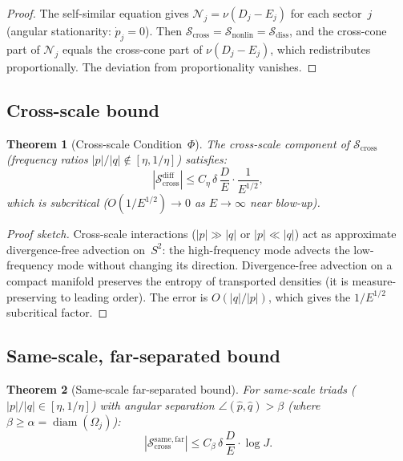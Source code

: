 \documentclass[11pt]{article}
\newtheorem{theorem}{Theorem}[section]
\theoremstyle{definition}
\newcommand{\cS}{\mathcal{S}}
\newcommand{\cN}{\mathcal{N}}
\DeclareMathOperator{\diam}{diam}
\begin{document}
\begin{proof}
The self-similar equation gives $\cN_j = \nu(D_j - E_j)$
for each sector~$j$ (angular stationarity: $\dot{p}_j = 0$).
Then
$\cS_{\mathrm{cross}} = \cS_{\mathrm{nonlin}}
= \cS_{\mathrm{diss}}$, and the cross-cone part of
$\cN_j$ equals the cross-cone part of $\nu(D_j - E_j)$,
which redistributes proportionally.  The deviation from
proportionality vanishes.
\end{proof}


\subsection{Cross-scale bound}

\begin{theorem}[Cross-scale Condition~$\Phi$]
\label{thm:cross-scale}
The cross-scale component of $\cS_{\mathrm{cross}}$
(frequency ratios $|p|/|q| \notin [\eta, 1/\eta]$)
satisfies:
\begin{equation}
|\cS_{\mathrm{cross}}^{\mathrm{diff}}|
\leq C_\eta\,\delta\,\frac{D}{E}\cdot\frac{1}{E^{1/2}},
\end{equation}
which is subcritical ($O(1/E^{1/2}) \to 0$ as
$E \to \infty$ near blow-up).
\end{theorem}

\begin{proof}[Proof sketch]
Cross-scale interactions ($|p| \gg |q|$ or $|p| \ll |q|$)
act as approximate divergence-free advection on~$S^2$:
the high-frequency mode advects the low-frequency mode
without changing its direction.  Divergence-free advection
on a compact manifold preserves the entropy of transported
densities (it is measure-preserving to leading order).
The error is $O(|q|/|p|)$, which gives the $1/E^{1/2}$
subcritical factor.
\end{proof}


\subsection{Same-scale, far-separated bound}

\begin{theorem}[Same-scale far-separated bound]
\label{thm:same-far}
For same-scale triads ($|p|/|q|\in[\eta,1/\eta]$) with
angular separation $\angle(\hat{p},\hat{q}) > \beta$
(where $\beta \geq \alpha = \diam(\Omega_j)$):
\begin{equation}
|\cS_{\mathrm{cross}}^{\mathrm{same,far}}|
\leq C_\beta\,\delta\,\frac{D}{E}\cdot
\log J.
\end{equation}
\end{theorem}
\end{document}
